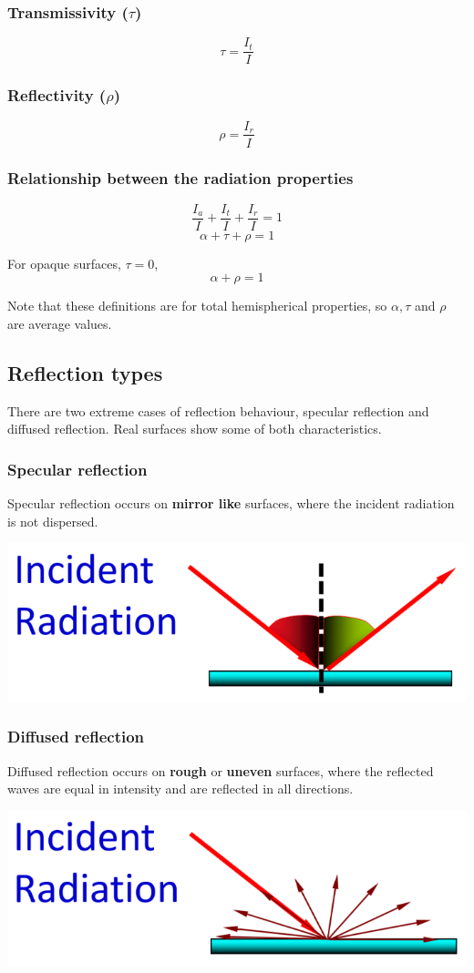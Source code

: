 \documentclass[11pt]{article}
\begin{document}
\subsubsection{Transmissivity (\(\tau\))}
\label{sec:org4178b37}
\[\tau = \frac{I_t}{I}\]
\subsubsection{Reflectivity (\(\rho\))}
\label{sec:org203e7e5}
\[\rho = \frac{I_r}{I}\]
\subsubsection{Relationship between the radiation properties}
\label{sec:org6854268}
\[\frac{I_a}{I} + \frac{I_t}{I} + \frac{I_r}{I} = 1\]
\[\alpha + \tau + \rho = 1\]

For opaque surfaces, \(\tau = 0\),
\[\alpha + \rho = 1\]

Note that these definitions are for total hemispherical properties, so \(\alpha, \tau\) and \(\rho\) are average values.
\subsection{Reflection types}
\label{sec:orgf523055}
There are two extreme cases of reflection behaviour, specular reflection and diffused reflection. Real surfaces show some of both characteristics.
\subsubsection{Specular reflection}
\label{sec:orga78e134}
Specular reflection occurs on \textbf{mirror like} surfaces, where the incident radiation is not dispersed.
\begin{center}
\includegraphics[width=.9\linewidth]{./images/specular-reflection-diagram.png}
\end{center}
\subsubsection{Diffused reflection}
\label{sec:orgdb69221}
Diffused reflection occurs on \textbf{rough} or \textbf{uneven} surfaces, where the reflected waves are equal in intensity and are reflected in all directions.
\begin{center}
\includegraphics[width=.9\linewidth]{./images/diffused-reflection-diagram.png}
\end{center}
\end{document}
